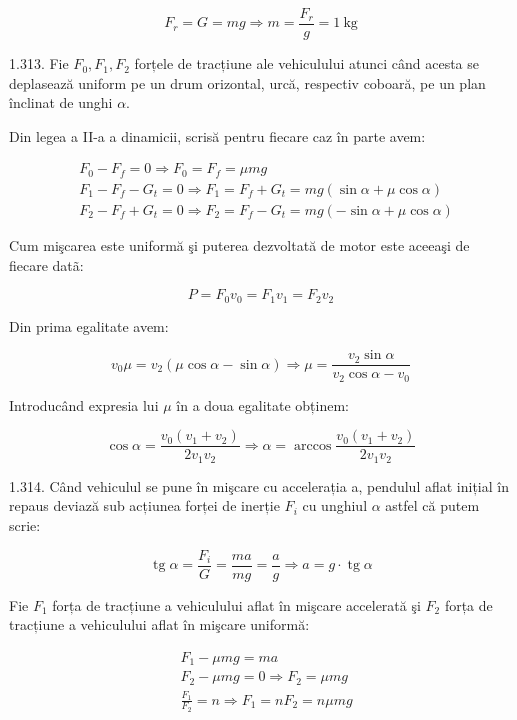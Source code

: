 $$
F_{r}=G=m g \Rightarrow m=\frac{F_{r}}{g}=1 \mathrm{~kg}
$$

1.313. Fie $F_{0}, F_{1}, F_{2}$ forțele de tracțiune ale vehiculului atunci când acesta se deplasează uniform pe un drum orizontal, urcă, respectiv coboară, pe un plan înclinat de unghi $\alpha$.

Din legea a II-a a dinamicii, scrisă pentru fiecare caz în parte avem:

$$
\begin{aligned}
& F_{0}-F_{f}=0 \Rightarrow F_{0}=F_{f}=\mu m g \\
& F_{1}-F_{f}-G_{t}=0 \Rightarrow F_{1}=F_{f}+G_{t}=m g(\sin \alpha+\mu \cos \alpha) \\
& F_{2}-F_{f}+G_{t}=0 \Rightarrow F_{2}=F_{f}-G_{t}=m g(-\sin \alpha+\mu \cos \alpha)
\end{aligned}
$$

Cum mişcarea este uniformă şi puterea dezvoltată de motor este aceeaşi de fiecare datã:

$$
P=F_{0} v_{0}=F_{1} v_{1}=F_{2} v_{2}
$$

Din prima egalitate avem:

$$
v_{0} \mu=v_{2}(\mu \cos \alpha-\sin \alpha) \Rightarrow \mu=\frac{v_{2} \sin \alpha}{v_{2} \cos \alpha-v_{0}}
$$

Introducând expresia lui $\mu$ în a doua egalitate obținem:

$$
\cos \alpha=\frac{v_{0}\left(v_{1}+v_{2}\right)}{2 v_{1} v_{2}} \Rightarrow \alpha=\arccos \frac{v_{0}\left(v_{1}+v_{2}\right)}{2 v_{1} v_{2}}
$$

1.314. Când vehiculul se pune în mişcare cu accelerația a, pendulul aflat inițial în repaus deviază sub acțiunea forței de inerție $F_{i}$ cu unghiul $\alpha$ astfel că putem scrie:


\begin{equation*}
\operatorname{tg} \alpha=\frac{F_{i}}{G}=\frac{m a}{m g}=\frac{a}{g} \Rightarrow a=g \cdot \operatorname{tg} \alpha \tag{1}
\end{equation*}


Fie $F_{1}$ forța de tracțiune a vehiculului aflat în mişcare accelerată şi $F_{2}$ forța de tracțiune a vehiculului aflat în mişcare uniformă:


\begin{align*}
& F_{1}-\mu m g=m a  \tag{2}\\
& F_{2}-\mu m g=0 \Rightarrow F_{2}=\mu m g \\
& \frac{F_{1}}{F_{2}}=n \Rightarrow F_{1}=n F_{2}=n \mu m g
\end{align*}



